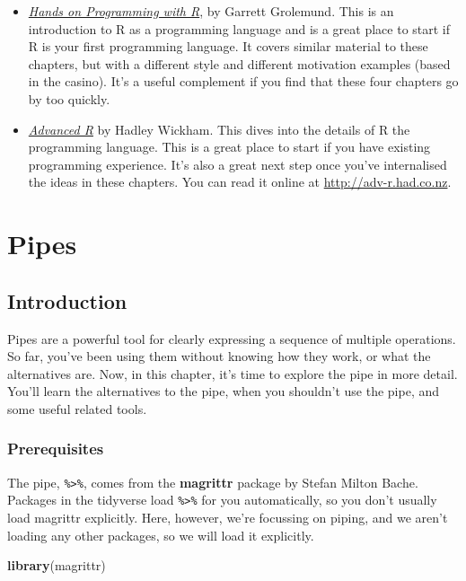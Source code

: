 \documentclass[]{book}
\newenvironment{Shaded}{\begin{snugshade}}{\end{snugshade}}
\newcommand{\KeywordTok}[1]{\textcolor[rgb]{0.13,0.29,0.53}{\textbf{{#1}}}}
\newcommand{\NormalTok}[1]{{#1}}
\begin{document}
\begin{itemize}
\item
  \href{https://amzn.com/1449359019}{\emph{Hands on Programming with
  R}}, by Garrett Grolemund. This is an introduction to R as a
  programming language and is a great place to start if R is your first
  programming language. It covers similar material to these chapters,
  but with a different style and different motivation examples (based in
  the casino). It's a useful complement if you find that these four
  chapters go by too quickly.
\item
  \href{https://amzn.com/1466586966}{\emph{Advanced R}} by Hadley
  Wickham. This dives into the details of R the programming language.
  This is a great place to start if you have existing programming
  experience. It's also a great next step once you've internalised the
  ideas in these chapters. You can read it online at
  \url{http://adv-r.had.co.nz}.
\end{itemize}

\hypertarget{pipes}{\chapter{Pipes}\label{pipes}}

\section{Introduction}\label{introduction-11}

Pipes are a powerful tool for clearly expressing a sequence of multiple
operations. So far, you've been using them without knowing how they
work, or what the alternatives are. Now, in this chapter, it's time to
explore the pipe in more detail. You'll learn the alternatives to the
pipe, when you shouldn't use the pipe, and some useful related tools.

\subsection{Prerequisites}\label{prerequisites-11}

The pipe, \texttt{\%\textgreater{}\%}, comes from the \textbf{magrittr}
package by Stefan Milton Bache. Packages in the tidyverse load
\texttt{\%\textgreater{}\%} for you automatically, so you don't usually
load magrittr explicitly. Here, however, we're focussing on piping, and
we aren't loading any other packages, so we will load it explicitly.

\begin{Shaded}
\begin{Highlighting}[]
\KeywordTok{library}\NormalTok{(magrittr)}
\end{Highlighting}
\end{Shaded}
\end{document}
